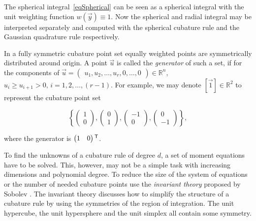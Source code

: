 The spherical integral~\eqref{eqSpherical} can be seen as a spherical integral with the unit weighting function $w(\vec{y}) \equiv 1$. Now the spherical and radial integral may be interpreted separately and computed with the spherical cubature rule and the Gaussian quadrature rule respectively.




In a fully symmetric cubature point set equally weighted points are symmetrically distributed around origin. A point $\vec{u}$ is called the \emph{generator} of such a set, if for the components of $\vec{u} = \begin{pmatrix} u_1,u_2,\ldots,u_r,0,\ldots,0 \end{pmatrix} \in \mathbb{R}^n$, $u_i \geq u_{i+1} > 0,\, i= 1,2,\ldots,(r-1)$. For example, we may denote $[\vec{1}] \in \mathbb{R}^2$ to represent the cubature point set 

\begin{equation*}
\left\{ 
  \begin{pmatrix}  1 \\  0  \end{pmatrix},
  \begin{pmatrix}  0 \\  1  \end{pmatrix},
  \begin{pmatrix} -1 \\  0  \end{pmatrix},
  \begin{pmatrix}  0 \\ -1  \end{pmatrix}
 \right\},
\end{equation*}

\noindent%
where the generator is $\begin{pmatrix} 1 & 0 \end{pmatrix}\mathsf{^T}$.

To find the unknowns of a cubature rule of degree $d$, a set of moment equations have to be solved. This, however, may not be a simple task with increasing dimensions and polynomial degree. To reduce the size of the system of equations or the number of needed cubature points \citep{Arasaratnam+Haykin:2009} use the \emph{invariant theory} proposed by Sobolev \citep[see][]{Cools:1997}. The invariant theory discusses how to simplify the structure of a cubature rule by using the symmetries of the region of integration. The unit hypercube, the unit  hypersphere and the unit simplex all contain some symmetry.

